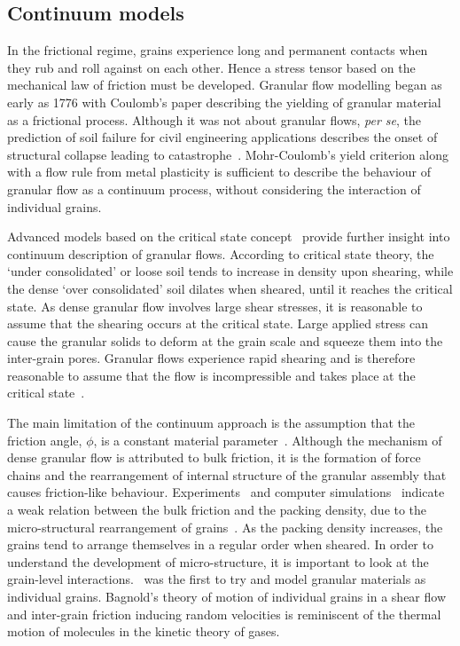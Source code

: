 \subsection{Continuum models}

In the frictional regime, grains experience long and permanent contacts when 
they rub and roll against on each other. Hence a stress tensor based on the 
mechanical law of friction must be developed. Granular flow modelling began as 
early as 1776 with Coulomb's paper describing the yielding of granular material 
as a frictional process. Although it was not about granular flows, \textit{per 
se}, the prediction of 
soil failure for civil engineering applications describes the onset of 
structural collapse leading to catastrophe~\citep{Campbell2006}. Mohr-Coulomb's 
yield criterion along with a flow rule from metal plasticity is sufficient to 
describe the behaviour of granular flow as a continuum process, without 
considering the interaction of individual grains.

Advanced models based on the critical state concept~\citep{Schofield1968} 
provide further insight into 
continuum description of granular flows. According to critical state 
theory, the `under consolidated' or loose soil tends to increase in density 
upon shearing, while the dense `over consolidated' soil dilates when sheared, 
until it reaches the critical state. As dense granular flow involves large 
shear stresses, it is reasonable to assume that the shearing occurs at the 
critical state. Large applied stress can cause the granular solids to deform 
at the grain scale and squeeze them into the inter-grain pores. Granular flows 
experience rapid shearing and is therefore reasonable to assume that the flow 
is incompressible and takes place at the critical state~\citep{Campbell2006}. 

The main limitation of the continuum approach is the assumption that the 
friction angle, $\phi$, is a constant material parameter~\citep{Potapov1996}. 
Although the mechanism of dense granular flow is 
attributed to bulk friction, it is the formation of force chains and the 
rearrangement of internal structure of the granular assembly that causes 
friction-like behaviour. Experiments~\citep{Savage1984,Savage1984a} and 
computer simulations~\citep{Campbell1985} indicate a weak relation between the 
bulk friction and the packing density, due to the micro-structural 
rearrangement of grains~\citep{Campbell1986}. As the packing density 
increases, the grains tend to arrange themselves in a regular order when 
sheared. In order to understand the development of micro-structure, it is 
important to look at the grain-level interactions.~\citet{Bagnold1954} was 
the first to try and model granular materials as individual grains. 
Bagnold's theory of motion of individual grains in a shear flow and 
inter-grain friction inducing random velocities is reminiscent of the 
thermal motion of molecules in the kinetic theory of gases. 

